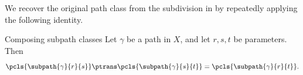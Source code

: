 We recover the original path class from the subdivision in 
by repeatedly applying the following identity.

\begin{lemma}[id=1.3]{Composing subpath classes}
Let $\gamma$ be a path in $X$, and let $r,s,t$ be parameters.  Then
\[
  \pcls{\subpath{\gamma}{r}{s}} \ptrans \pcls{\subpath{\gamma}{s}{t}}
    = \pcls{\subpath{\gamma}{r}{t}}.
\]
\end{lemma}
